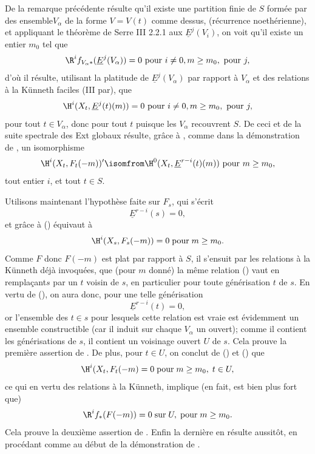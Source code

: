 De la remarque pr\'ec\'edente r\'esulte qu'il existe une partition finie de $S$ form\'ee par des ensemble$V_\alpha$ de la forme $V=V(t)$ comme dessus, (r\'ecurrence noeth\'erienne), et appliquant le th\'eor\`eme de Serre \EGA III 2.2.1 aux $\underline{E}^j(V_i)$, on voit qu'il existe un entier $m_0$ tel que
\[
\R^if_{V_\alpha\ast}(\underline{E}^j(V_\alpha))=0\textup{ pour } i\neq 0, m\geq m_0, \textup{ pour }j,
\]
d'o\`u il r\'esulte, utilisant la platitude de $\underline{E}^j(V_\alpha)$ par rapport \`a $V_\alpha$ et des relations \`a la Künneth faciles (\cf \EGA III par), que
\[
\H^i(X_t, \underline{E}^j(t)(m))=0\textup{ pour } i\neq 0, m\geq m_0, \textup{ pour }j,
\]
pour tout $t\in V_\alpha$, donc pour tout $t$ puisque les $ V_\alpha$ recouvrent $S$. De ceci et de la suite spectrale des Ext globaux r\'esulte, gr\^ace \`a , comme dans la d\'emonstration de , un isomorphisme
\steco
\begin{equation} \label{eq:XII.8} {}\H^i(X_t, F_t(-m))' \isomfrom \H^0(X_t, \underline{E}^{r-i}(t)(m))\textup{ pour } m\geq m_0,
\end{equation}
tout entier $i$, et tout $t\in S$.

Utilisons maintenant l'hypoth\`ese faite sur $F_s$, qui s'\'ecrit
\steco
\begin{equation} \label{eq:XII.9} {}\underline{E}^{r-i}(s)=0,
\end{equation}
et gr\^ace \`a () \'equivaut \`a
\steco
\begin{equation} \label{eq:XII.10} {}\H^i(X_s, F_s(-m))=0 \; \text{pour}\; m\geq m_0.
\end{equation}
Comme $F$ donc $F(-m)$ est plat par rapport \`a $S$, il s'ensuit par
les relations \`a la Künneth d\'ej\`a invoqu\'ees, que (pour $m$ donn\'e) la
m\^eme relation () vaut en rempla\c cant\pageoriginale $s$ par un
$t$ voisin de $s$, en particulier pour toute g\'en\'erisation $t$ de
$s$. En vertu de (), on aura donc, pour une telle
g\'en\'erisation \steco
\begin{equation} \label{eq:XII.11} {}\underline{E}^{r-i}(t)=0,
\end{equation}
or l'ensemble des $t\in s$ pour lesquels cette relation est vraie est \'evidemment un ensemble constructible (car il induit sur chaque $V_\alpha$ un ouvert); comme il contient les g\'en\'erisations de $s$, il contient un voisinage ouvert $U$ de $s$. Cela prouve la premi\`ere assertion de . De plus, pour $t\in U$, on conclut de () et () que
\steco
\begin{equation} \label{eq:XII.12} {}\H^i(X_t, F_t(-m)=0 \; \text{pour}\; m\geq m_0, \; t\in U,
\end{equation}
ce qui en vertu des relations \`a la Künneth, implique (en fait, est bien plus fort que)
\steco
\begin{equation} \label{eq:XII.13} {}\R^if_\ast(F(-m))=0 \; \text{sur}\; U, \; \text{pour} \; m\geq m_0.
\end{equation}
Cela prouve la deuxi\`eme assertion de . Enfin la derni\`ere en r\'esulte aussit\^{o}t, en proc\'edant comme au d\'ebut de la d\'emonstration de .

